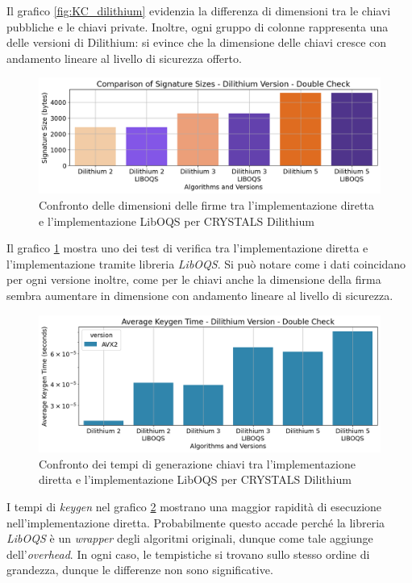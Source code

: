 Il grafico \ref{fig:KC_dilithium} evidenzia la differenza di dimensioni tra le chiavi pubbliche e le chiavi private. Inoltre, ogni gruppo di colonne rappresenta una delle versioni di Dilithium: si evince che la dimensione delle chiavi cresce con andamento lineare al livello di sicurezza offerto.

\begin{figure}[H]
    \centering
    \includegraphics[width=1\textwidth]{Immagini/20240822_i9/Message_IO/double_check/IO_dilithium.png}
    \caption{Confronto delle dimensioni delle firme tra l'implementazione diretta e l'implementazione LibOQS per CRYSTALS Dilithium}
    \label{fig:IO_dilithium}
\end{figure}

Il grafico \ref{fig:IO_dilithium} mostra uno dei test di verifica tra l'implementazione diretta e l'implementazione tramite libreria \textit{LibOQS}. Si può notare come i dati coincidano per ogni versione inoltre, come per le chiavi anche la dimensione della firma sembra aumentare in dimensione con andamento lineare al livello di sicurezza.

\begin{figure}[H]
    \centering
    \includegraphics[width=1\textwidth]{Immagini/20240822_i9/Time_Keygen/double_check/TM_KG_dilithium.png}
    \caption{Confronto dei tempi di generazione chiavi tra l'implementazione diretta e l'implementazione LibOQS per CRYSTALS Dilithium}
    \label{fig:TM_KG_dilithium}
\end{figure}

I tempi di \textit{keygen} nel grafico \ref{fig:TM_KG_dilithium} mostrano una maggior rapidità di esecuzione nell'implementazione diretta. Probabilmente questo accade perché la libreria \textit{LibOQS} è un \textit{wrapper} degli algoritmi originali, dunque come tale aggiunge dell'\textit{overhead}. In ogni caso, le tempistiche si trovano sullo stesso ordine di grandezza, dunque le differenze non sono significative.

